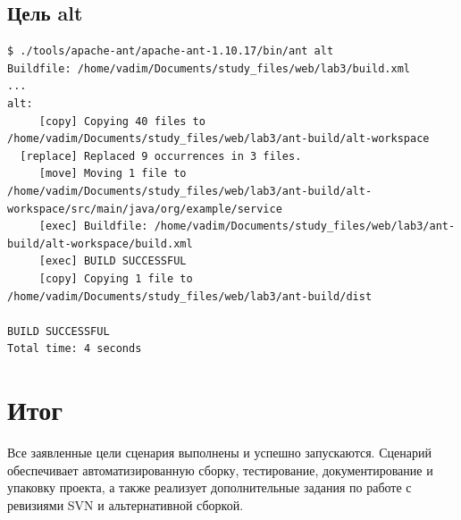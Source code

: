 \documentclass[12pt,a4paper]{article}
\begin{document}
\subsection*{Цель alt}
\begin{Verbatim}[fontsize=\small,breaklines=true]
$ ./tools/apache-ant/apache-ant-1.10.17/bin/ant alt
Buildfile: /home/vadim/Documents/study_files/web/lab3/build.xml
...
alt:
     [copy] Copying 40 files to /home/vadim/Documents/study_files/web/lab3/ant-build/alt-workspace
  [replace] Replaced 9 occurrences in 3 files.
     [move] Moving 1 file to /home/vadim/Documents/study_files/web/lab3/ant-build/alt-workspace/src/main/java/org/example/service
     [exec] Buildfile: /home/vadim/Documents/study_files/web/lab3/ant-build/alt-workspace/build.xml
     [exec] BUILD SUCCESSFUL
     [copy] Copying 1 file to /home/vadim/Documents/study_files/web/lab3/ant-build/dist

BUILD SUCCESSFUL
Total time: 4 seconds
\end{Verbatim}

\section{Итог}
Все заявленные цели сценария выполнены и успешно запускаются.
Сценарий обеспечивает автоматизированную сборку, тестирование, документирование и упаковку проекта,
а также реализует дополнительные задания по работе с ревизиями SVN и альтернативной сборкой.
\end{document}
